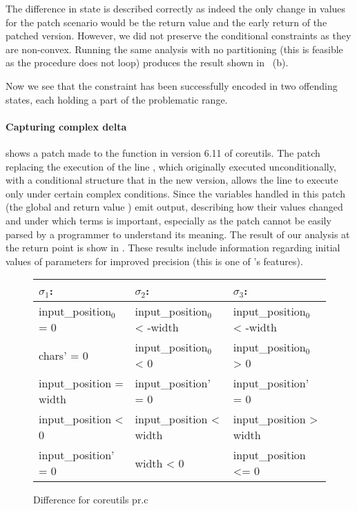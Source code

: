The difference in state is described correctly as indeed the only change in values for the patch scenario would be the return value and the early return of the patched version. However, we did not preserve the conditional constraints as they are non-convex. Running the same analysis with no partitioning (this is feasible as the procedure does not loop) produces the result shown in ~(b).

Now we see that the  constraint has been successfully encoded in two offending states, each holding a part of the problematic range.

\paragraph{Capturing complex delta}



 shows a patch made to the  function in version 6.11 of coreutils. The patch replacing the execution of the line , which originally executed unconditionally, with a conditional structure that in the new version, allows the line to execute only under certain complex conditions. Since the variables handled in this patch (the global  and return value ) emit output, describing how their values changed and under which terms is important, especially as the patch cannot be easily parsed by a programmer to understand its meaning. The result of our analysis at the return point is show in . These results include information regarding initial values of parameters for improved precision (this is one of {\tool}'s features).

\begin{figure}
\scriptsize
\centering
\begin{tabular}{l|l|l}
$\sigma_1$:                 & $\sigma_2$:                   & $\sigma_3$:
\\ \hline
input\_position${_0}$ = 0     & input\_position${_0}$  < -width & input\_position${_0}$  < -width
\\
chars' = 0                & input\_position${_0}$  < 0      & input\_position${_0}$  > 0
\\
input\_position = width   & input\_position' = 0        & input\_position' = 0
\\
input\_position < 0       & input\_position < width     & input\_position > width
\\
input\_position' = 0      & width < 0                   & input\_position <= 0
\\ \hline
\end{tabular}
\caption{Difference for coreutils pr.c }\label{Fi:CharToClump}
\end{figure}

